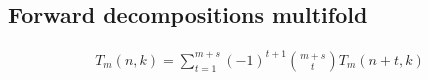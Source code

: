 ﻿\subsection{Forward decompositions multifold}\label{subsec:forward-decompositions-multifold}
\begin{proposition}
    \label{prop:Tm-recurrence-forward-multifold}
    \begin{align*}
        T_{m} (n,k) = \sum_{t=1}^{m+s} (-1)^{t+1} \binom{m+s}{t} T_{m} (n+t, k)
    \end{align*}
\end{proposition}
